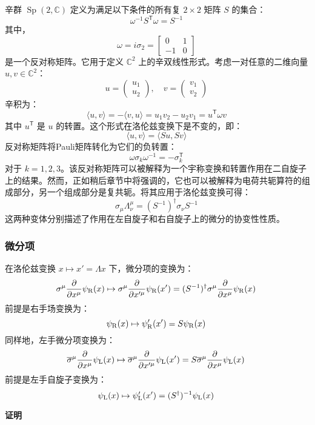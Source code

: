 辛群 \( \operatorname{Sp}(2, \mathbb{C}) \) 定义为满足以下条件的所有复 \( 2 \times 2 \) 矩阵 \( S \) 的集合：
\[
\omega^{-1} S^{\textsf{T}} \omega = S^{-1}~
\]
其中，
\[
\omega = i \sigma_2 = \begin{bmatrix} 0 & 1 \\ -1 & 0 \end{bmatrix}~
\]
是一个反对称矩阵。它用于定义 \( \mathbb{C}^2 \) 上的辛双线性形式。考虑一对任意的二维向量 \( u, v \in \mathbb{C}^2 \)：
\[
u = \begin{pmatrix} u_1 \\ u_2 \end{pmatrix}, \quad v = \begin{pmatrix} v_1 \\ v_2 \end{pmatrix}~
\]
辛积为：
\[
\langle u, v \rangle = - \langle v, u \rangle = u_1 v_2 - u_2 v_1 = u^{\textsf{T}} \omega v~
\]
其中 \( u^{\textsf{T}} \) 是 \( u \) 的转置。这个形式在洛伦兹变换下是不变的，即：
\[
\langle u, v \rangle = \langle S u, S v \rangle~
\]
反对称矩阵将Pauli矩阵转化为它们的负转置：
\[
\omega \sigma_k \omega^{-1} = - \sigma_k^{\textsf{T}}~
\]
对于 \( k = 1, 2, 3 \)。该反对称矩阵可以被解释为一个宇称变换和转置作用在二自旋子上的结果。然而，正如稍后章节中将强调的，它也可以被解释为电荷共轭算符的组成部分，另一个组成部分是复共轭。将其应用于洛伦兹变换可得：
\[
\sigma_{\mu} \Lambda^{\mu}_{\nu} = \left( S^{-1} \right)^{\dagger} \sigma_{\nu} S^{-1}~
\]
这两种变体分别描述了作用在左自旋子和右自旋子上的微分的协变性性质。
\subsubsection{微分项}
在洛伦兹变换 \( x \mapsto x' = \Lambda x \) 下，微分项的变换为：
\[
\sigma^{\mu} \frac{\partial}{\partial x^{\mu}} \psi_{\rm{R}}(x) \mapsto \sigma^{\mu} \frac{\partial}{\partial x'^{\mu}} \psi_{\rm{R}}(x') = (S^{-1})^{\dagger} \sigma^{\mu} \frac{\partial}{\partial x^{\mu}} \psi_{\rm{R}}(x)~
\]
前提是右手场变换为：
\[
\psi_{\rm{R}}(x) \mapsto \psi_{\rm{R}}^{\prime}(x') = S \psi_{\rm{R}}(x)~
\]
同样地，左手微分项变换为：
\[
\overline{\sigma}^{\mu} \frac{\partial}{\partial x^{\mu}} \psi_{\rm{L}}(x) \mapsto \overline{\sigma}^{\mu} \frac{\partial}{\partial x'^{\mu}} \psi_{\rm{L}}(x') = S \overline{\sigma}^{\mu} \frac{\partial}{\partial x^{\mu}} \psi_{\rm{L}}(x)~
\]
前提是左手自旋子变换为：
\[
\psi_{\rm{L}}(x) \mapsto \psi_{\rm{L}}^{\prime}(x') = (S^{\dagger})^{-1} \psi_{\rm{L}}(x)~
\]

\textbf{证明}

